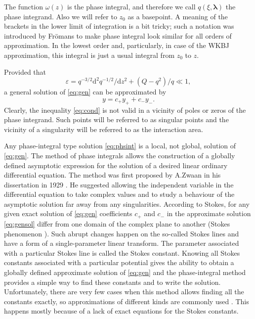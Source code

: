 \documentclass[atmp]{ipart_v1}
\def\rmd{\mathrm{d}}
\def\lmbd{\bm{\lambda}}
\def\w{\omega}
\newcommand\eref[1]{\eqref{#1}}
\newcommand\phsintgrnd[1][z]{q(#1,\lmbd)}
\begin{document}
The function $\w(z)$ is the phase integral, and therefore we call $\phsintgrnd[\xi]$ 
the phase integrand. Also we will refer to $z_0$ as a basepoint. A meaning of the brackets in the 
lower limit of integration is a bit tricky; such a notation was introduced by Fr\"omans \cite{frpaper} to make
phase integral look similar for all orders of approximation. In the lowest order and, particularly,
in case of the WKBJ approximation, this integral is just a usual integral from $z_0$ to $z$.
 
Provided that 
\begin{equation}
\varepsilon = q^{-3/2} \rmd^2 q^{-1/2}/\rmd z^2  + (Q - q^2)/q \ll 1,   \label{eq:cond}
\end{equation}
a general solution of \eref{eq:gen} can be approximated by
\begin{equation}
y = c_+y_+ + c_-y_-. \label{eq:gensol}
\end{equation}
Clearly, the inequality \eref{eq:cond} is not valid in a vicinity of poles or zeros of 
the phase integrand. Such points will be referred to as singular points and the 
vicinity of a singularity will be referred to as the interaction area.

Any phase-integral type solution \eref{eq:phsint} is a local, not global, solution of \eref{eq:gen}. 
The method of phase integrals allows the construction of a globally defined 
asymptotic expression for the solution of a desired linear ordinary differential 
equation. The method was first proposed by A.Zwaan in his dissertation in 1929 \cite{zwaan}. 
He suggested allowing the independent variable in the differential equation to take 
complex values and to study a behaviour of the asymptotic solution far away from any 
singularities. According to Stokes\cite{stokes}, for any given exact solution 
of \eref{eq:gen} coefficients $c_+$ and $c_-$ in the approximate solution \eref{eq:gensol} 
differ from one domain of the complex plane to another 
(Stokes phenomenon \cite{stokes,white,heading,frbook}). Such abrupt 
changes happen on the so-called Stokes lines and have a form of a single-parameter 
linear transform\cite{heading}. The parameter associated with a particular Stokes line 
is called the Stokes constant. Knowing all Stokes constants associated with a particular 
potential gives the ability to obtain a globally defined approximate solution 
of \eref{eq:gen}\cite{heading,white} and the phase-integral method provides a simple 
way to find these constants and to write the solution. Unfortunately, there are very few 
cases when this method allows finding all the constants exactly, so approximations of different 
kinds are commonly used \cite{white,ours}. This happens mostly because of a lack of 
exact equations for the Stokes constants.
 
\end{document}
